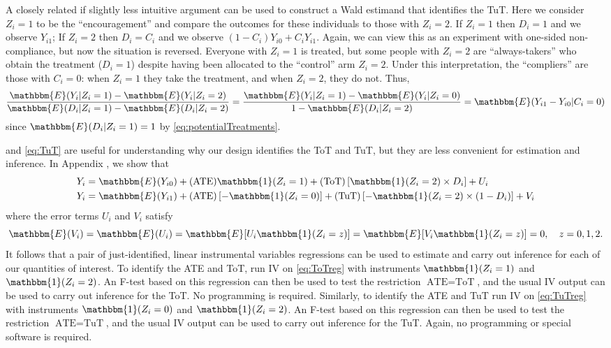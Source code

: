 \documentclass[oneside,11pt]{article}
\begin{document}
A closely related if slightly less intuitive argument can be used to construct a Wald estimand that identifies the TuT. Here we consider $Z_i = 1$ to be the ``encouragement'' and compare the outcomes for these individuals to those with $Z_i = 2$. If $Z_i = 1$ then $D_i = 1$ and we observe $Y_{i1}$; If $Z_i = 2$ then $D_i = C_i$ and we observe $(1 - C_i) Y_{i0} + C_i Y_{i1}$. Again, we can view this as an experiment with one-sided non-compliance, but now the situation is reversed. Everyone with $Z_i = 1$ is treated, but some people with $Z_i = 2$ are ``always-takers'' who obtain the treatment ($D_i = 1$) despite having been allocated to the ``control'' arm $Z_i=2$. Under this interpretation, the ``compliers'' are those with $C_i = 0$: when $Z_i=1$ they take the treatment, and when $Z_i=2$, they do not. Thus, 
\begin{equation}
\frac{\mathbbm{E}(Y_i|Z_i=1) - \mathbbm{E}(Y_i|Z_i =2)}{\mathbbm{E}(D_i|Z_i=1)-\mathbbm{E}(D_i|Z_i=2)} = 
\frac{\mathbbm{E}(Y_i|Z_i=1) - \mathbbm{E}(Y_i|Z_i =0)}{1 - \mathbbm{E}(D_i|Z_i=2)} = \mathbbm{E}(Y_{i1} - Y_{i0} | C_i = 0)
\label{eq:TuT}
\end{equation}
since $\mathbbm{E}(D_i|Z_i = 1)= 1$ by \eqref{eq:potentialTreatments}. 

 and \eqref{eq:TuT} are useful for understanding why our design identifies the ToT and TuT, but they are less convenient for estimation and inference. In Appendix , we show that
\begin{align}
\label{eq:ToTreg}
Y_i &= \mathbbm{E}(Y_{i0}) + (\text{ATE}) \mathbbm{1}(Z_i = 1) + (\text{ToT}) \left[\mathbbm{1}(Z_i = 2) \times D_i\right] + U_i \\
\label{eq:TuTreg}
Y_i &= \mathbbm{E}(Y_{i1}) + (\text{ATE}) \left[ -\mathbbm{1}(Z_i = 0)\right] + (\text{TuT}) \left[ -\mathbbm{1}(Z_i = 2) \times (1 - D_i)\right] + V_i 
\end{align}
where the error terms $U_i$ and $V_i$ satisfy 
\[
\mathbbm{E}(V_i) = \mathbbm{E}(U_i) = \mathbbm{E}[U_i \mathbbm{1}(Z_i = z)] = \mathbbm{E}[V_i \mathbbm{1}(Z_i = z)] = 0, \quad z = 0, 1, 2.
\]
It follows that a pair of just-identified, linear instrumental variables regressions can be used to estimate and carry out inference for each of our quantities of interest. To identify the ATE and ToT, run IV on \eqref{eq:ToTreg} with instruments $\mathbbm{1}(Z_i = 1)$ and $\mathbbm{1}(Z_i=2)$. An F-test based on this regression can then be used to test the restriction $\text{ATE} = \text{ToT}$, and the usual IV output can be used to carry out inference for the ToT. No programming is required. Similarly, to identify the ATE and TuT run IV on \ref{eq:TuTreg} with instruments $\mathbbm{1}(Z_i = 0)$ and $\mathbbm{1}(Z_i = 2)$. An F-test based on this regression can then be used to test the restriction $\text{ATE} = \text{TuT}$, and the usual IV output can be used to carry out inference for the TuT. Again, no programming or special software is required. 
\end{document}
